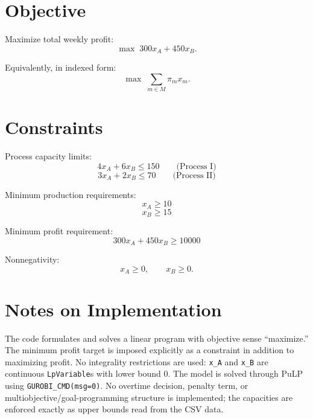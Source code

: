 \section*{Objective}

Maximize total weekly profit:
\[
\max \; 300x_A + 450x_B.
\]

Equivalently, in indexed form:
\[
\max \; \sum_{m \in M} \pi_m x_m.
\]

\section*{Constraints}

Process capacity limits:
\[
4x_A + 6x_B \le 150 \qquad \text{(Process I)}
\]
\[
3x_A + 2x_B \le 70 \qquad \text{(Process II)}
\]

Minimum production requirements:
\[
x_A \ge 10
\]
\[
x_B \ge 15
\]

Minimum profit requirement:
\[
300x_A + 450x_B \ge 10000
\]

Nonnegativity:
\[
x_A \ge 0,\qquad x_B \ge 0.
\]

\section*{Notes on Implementation}

The code formulates and solves a linear program with objective sense ``maximize.'' The minimum profit target is imposed explicitly as a constraint in addition to maximizing profit. No integrality restrictions are used: \texttt{x\_A} and \texttt{x\_B} are continuous \texttt{LpVariable}s with lower bound $0$. The model is solved through PuLP using \texttt{GUROBI\_CMD(msg=0)}. No overtime decision, penalty term, or multiobjective/goal-programming structure is implemented; the capacities are enforced exactly as upper bounds read from the CSV data.
